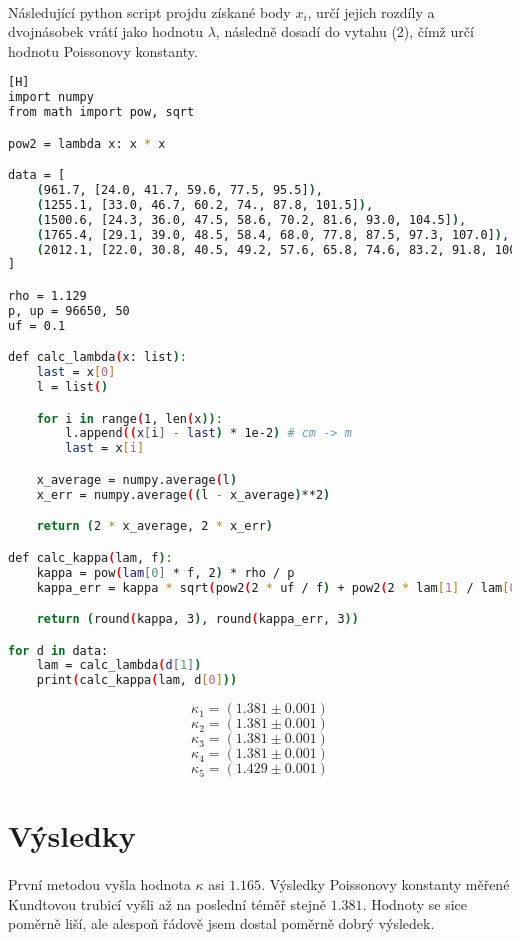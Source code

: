 \documentclass[a4paper,11pt]{article}
\begin{document}
        \paragraph{} Následující python script projdu získané body $x_{i}$, určí jejich rozdíly
        a dvojnásobek vrátí jako hodnotu $\lambda$, následně dosadí do vytahu (2), čímž 
        určí hodnotu Poissonovy konstanty.

\begin{lstlisting}[language=Bash][H]
import numpy
from math import pow, sqrt

pow2 = lambda x: x * x

data = [
    (961.7, [24.0, 41.7, 59.6, 77.5, 95.5]),
    (1255.1, [33.0, 46.7, 60.2, 74., 87.8, 101.5]),
    (1500.6, [24.3, 36.0, 47.5, 58.6, 70.2, 81.6, 93.0, 104.5]),
    (1765.4, [29.1, 39.0, 48.5, 58.4, 68.0, 77.8, 87.5, 97.3, 107.0]),
    (2012.1, [22.0, 30.8, 40.5, 49.2, 57.6, 65.8, 74.6, 83.2, 91.8, 100.3, 108.9])
]

rho = 1.129
p, up = 96650, 50
uf = 0.1

def calc_lambda(x: list):
    last = x[0]
    l = list()

    for i in range(1, len(x)):
        l.append((x[i] - last) * 1e-2) # cm -> m
        last = x[i]

    x_average = numpy.average(l)
    x_err = numpy.average((l - x_average)**2)

    return (2 * x_average, 2 * x_err)

def calc_kappa(lam, f):
    kappa = pow(lam[0] * f, 2) * rho / p
    kappa_err = kappa * sqrt(pow2(2 * uf / f) + pow2(2 * lam[1] / lam[0]) + pow2(up / p))

    return (round(kappa, 3), round(kappa_err, 3))

for d in data:
    lam = calc_lambda(d[1])
    print(calc_kappa(lam, d[0])) \end{lstlisting}

    $$ \kappa_{1} = \left(1.381 \pm 0.001\right)$$
    $$ \kappa_{2} = \left(1.381 \pm 0.001\right)$$
    $$ \kappa_{3} = \left(1.381 \pm 0.001\right)$$
    $$ \kappa_{4} = \left(1.381 \pm 0.001\right)$$
    $$ \kappa_{5} = \left(1.429 \pm 0.001\right)$$

\section{Výsledky}

    \paragraph{} První metodou vyšla hodnota $\kappa$ asi $1.165$.  Výsledky Poissonovy 
    konstanty měřené Kundtovou trubicí vyšli až na poslední téměř stejně $1.381$. Hodnoty
    se sice poměrně liší, ale alespoň řádově jsem dostal poměrně dobrý výsledek.
\end{document}
